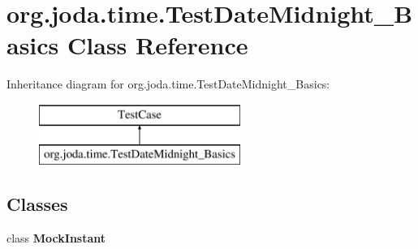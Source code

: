 \hypertarget{classorg_1_1joda_1_1time_1_1_test_date_midnight___basics}{\section{org.\-joda.\-time.\-Test\-Date\-Midnight\-\_\-\-Basics Class Reference}
\label{classorg_1_1joda_1_1time_1_1_test_date_midnight___basics}
}
Inheritance diagram for org.\-joda.\-time.\-Test\-Date\-Midnight\-\_\-\-Basics\-:\begin{figure}[H]
\begin{center}
\leavevmode
\includegraphics[height=2.000000cm]{classorg_1_1joda_1_1time_1_1_test_date_midnight___basics}
\end{center}
\end{figure}
\subsection*{Classes}
\begin{DoxyCompactItemize}
\item 
class {\bfseries Mock\-Instant}
\end{DoxyCompactItemize}
